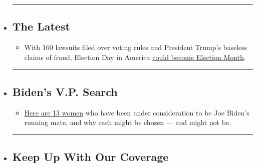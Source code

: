 \begin{itemize}
\item
  \begin{center}\rule{0.5\linewidth}{\linethickness}\end{center}

  \hypertarget{the-latest}{%
  \subsection{The Latest}\label{the-latest}}

  \begin{itemize}
  \tightlist
  \item
    With 160 lawsuits filed over voting rules and President Trump's
    baseless claims of fraud, Election Day in America
    \href{https://www.nytimes.com/2020/08/08/us/politics/voting-nov-3-election.html?action=click\&pgtype=Article\&state=default\&region=BELOW_MAIN_CONTENT\&context=storylines_guide}{could
    become Election Month}.
  \end{itemize}
\item
  \begin{center}\rule{0.5\linewidth}{\linethickness}\end{center}

  \hypertarget{bidens-vp-search}{%
  \subsection{Biden's V.P. Search}\label{bidens-vp-search}}

  \begin{itemize}
  \tightlist
  \item
    \href{https://www.nytimes.com/article/biden-vice-president-2020.html?action=click\&pgtype=Article\&state=default\&region=BELOW_MAIN_CONTENT\&context=storylines_guide}{Here
    are 13 women} who have been under consideration to be Joe Biden's
    running mate, and why each might be chosen --- and might not be.
  \end{itemize}
\item
  \begin{center}\rule{0.5\linewidth}{\linethickness}\end{center}

  \hypertarget{keep-up-with-our-coverage}{%
  \subsection{Keep Up With Our
  Coverage}\label{keep-up-with-our-coverage}}


\end{itemize}
